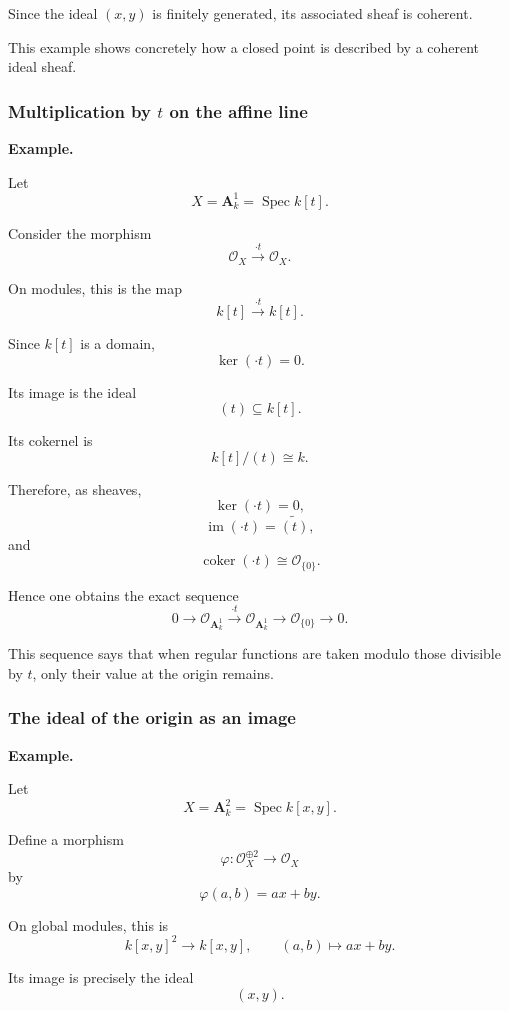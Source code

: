 \documentclass[12pt,a4paper]{article}
\theoremstyle{notespace}
\begin{document}
Since the ideal \((x,y)\) is finitely generated, its associated sheaf is coherent.

This example shows concretely how a closed point is described by a coherent ideal sheaf.

\subsubsection{Multiplication by \(t\) on the affine line}

\textbf{Example.}

Let
\[
X=\mathbf A^1_k=\operatorname{Spec}k[t].
\]

Consider the morphism
\[
\mathcal O_X
\xrightarrow{\cdot t}
\mathcal O_X.
\]

On modules, this is the map
\[
k[t]\xrightarrow{\cdot t}k[t].
\]

Since \(k[t]\) is a domain,
\[
\ker(\cdot t)=0.
\]

Its image is the ideal
\[
(t)\subseteq k[t].
\]

Its cokernel is
\[
k[t]/(t)\cong k.
\]

Therefore, as sheaves,
\[
\ker(\cdot t)=0,
\]
\[
\operatorname{im}(\cdot t)=\widetilde{(t)},
\]
and
\[
\operatorname{coker}(\cdot t)
\cong
\mathcal O_{\{0\}}.
\]

Hence one obtains the exact sequence
\[
0
\longrightarrow
\mathcal O_{\mathbf A^1_k}
\xrightarrow{\cdot t}
\mathcal O_{\mathbf A^1_k}
\longrightarrow
\mathcal O_{\{0\}}
\longrightarrow
0.
\]

This sequence says that when regular functions are taken modulo those divisible by \(t\), only their value at the origin remains.

\subsubsection{The ideal of the origin as an image}

\textbf{Example.}

Let
\[
X=\mathbf A^2_k=\operatorname{Spec}k[x,y].
\]

Define a morphism
\[
\varphi:\mathcal O_X^{\oplus 2}\longrightarrow\mathcal O_X
\]
by
\[
\varphi(a,b)=ax+by.
\]

On global modules, this is
\[
k[x,y]^2\longrightarrow k[x,y],
\qquad
(a,b)\longmapsto ax+by.
\]

Its image is precisely the ideal
\[
(x,y).
\]
\end{document}
